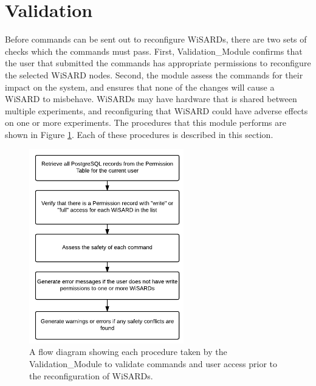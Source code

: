 \section{Validation}
Before commands can be sent out to reconfigure WiSARDs, there are two sets of checks which the commands must pass. First, Validation\_Module confirms that the user that submitted the commands has appropriate permissions to reconfigure the selected WiSARD nodes. Second, the module assess the commands for their impact on the system, and ensures that none of the changes will cause a WiSARD to misbehave. WiSARDs may have hardware that is shared between multiple experiments, and reconfiguring that WiSARD could have adverse effects on one or more experiments. The procedures that this module performs are shown in Figure \ref{fig:flow_validation_module}. Each of these procedures is described in this section.\\

\begin{figure}[H]
	\centering
	\includegraphics[width=0.6\textwidth]{figures/flow_diagram_validation_module.png}
	\caption{A flow diagram showing each procedure taken by the Validation\_Module to validate commands and user access prior to the reconfiguration of WiSARDs.}
	\label{fig:flow_validation_module}
\end{figure}

